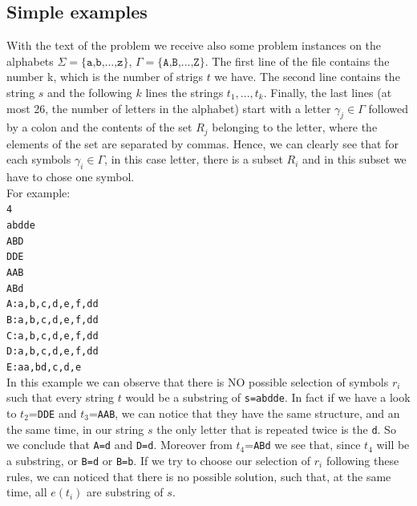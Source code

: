 \documentclass[paper=a4, fontsize=11pt]{scrartcl}
\numberwithin{equation}{section}		%
\numberwithin{figure}{section}			%
\numberwithin{table}{section}				%
\begin{document}
\subsection{Simple examples}
With the text of the problem we receive also some problem instances on the alphabets $\Sigma=\texttt{\{a,b,...,z\}}$, $\Gamma=\texttt{\{A,B,...,Z\}}$. The first line of the file contains the number k, which is the number of strigs $t$ we have. The second line contains the string $s$ and the following $k$ lines the strings $t_1,..., t_k$. Finally, the last lines (at most 26, the number of letters in the alphabet) start with a letter $\gamma_j\in \Gamma$ followed by a colon and the contents of the set $R_j$ belonging to the letter, where the elements of the set are separated by commas. Hence, we can clearly see that for each symbols $\gamma_i \in \Gamma$, in this case letter, there is a subset $R_i$ and in this subset we have to chose one symbol.
\newline
\\
\noindent For example: \newline
\\
\noindent\texttt{4} \\
\noindent \texttt{abdde} \\
\noindent \texttt{ABD} \\
\noindent \texttt{DDE} \\
\noindent \texttt{AAB} \\
\noindent \texttt{ABd} \\
\noindent \texttt{A:a,b,c,d,e,f,dd} \\
\noindent \texttt{B:a,b,c,d,e,f,dd} \\
\noindent \texttt{C:a,b,c,d,e,f,dd} \\
\noindent \texttt{D:a,b,c,d,e,f,dd} \\
\noindent \texttt{E:aa,bd,c,d,e} \\

\noindent In this example we can observe that there is NO possible selection of symbols $r_i$ such that every string $t$ would be a substring of \texttt{s=abdde}. In fact if we have a look to $t_2$=\texttt{DDE} and $t_3$=\texttt{AAB}, we can notice that they have the same structure, and an the same time, in our string $s$ the only letter that is repeated twice is the \texttt{d}. So we conclude that \texttt{A=d} and \texttt{D=d}. Moreover from $t_4$=\texttt{ABd} we see that, since $t_4$ will be a substring, or \texttt{B=d} or \texttt{B=b}. If we try to choose our selection of $r_i$ following these rules, we can noticed that there is no possible solution, such that, at the same time, all $e(t_i)$ are substring of $s$.
\end{document}
